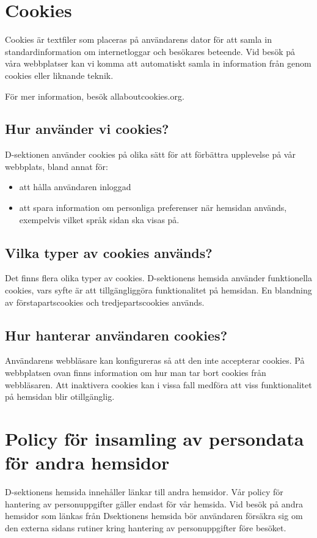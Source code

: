 \documentclass{dsekprotokoll}
\begin{document}
\section{Cookies}
Cookies är textfiler som placeras på användarens dator för att samla in standardinformation om internetloggar och besökares beteende. Vid besök på våra webbplatser kan vi komma att automatiskt samla in information från genom cookies eller liknande teknik.


För mer information, besök allaboutcookies.org.

\subsection{Hur använder vi cookies?}
D-sektionen använder cookies på olika sätt för att förbättra upplevelse på vår webbplats, bland
annat för:
\begin{itemize}
    \item att hålla användaren inloggad
    \item att spara information om personliga preferenser när hemsidan används, exempelvis vilket språk sidan ska visas på.
\end{itemize}
\subsection{Vilka typer av cookies används?}
Det finns flera olika typer av cookies. D-sektionens hemsida använder funktionella cookies,
vars syfte är att tillgängliggöra funktionalitet på hemsidan. En blandning av förstapartscookies
och tredjepartscookies används.

\subsection{Hur hanterar användaren cookies?}
Användarens webbläsare kan konfigureras så att den inte accepterar cookies. På webbplatsen
ovan finns information om hur man tar bort cookies från webbläsaren. Att inaktivera cookies
kan i vissa fall medföra att viss funktionalitet på hemsidan blir otillgänglig.

\section{Policy för insamling av persondata för andra hemsidor}
D-sektionens hemsida innehåller länkar till andra hemsidor. Vår policy för hantering av personuppgifter gäller endast för vår hemsida. Vid besök på andra hemsidor som länkas från Dsektionens hemsida bör användaren försäkra sig om den externa sidans rutiner kring hantering
av personuppgifter före besöket.
\end{document}
